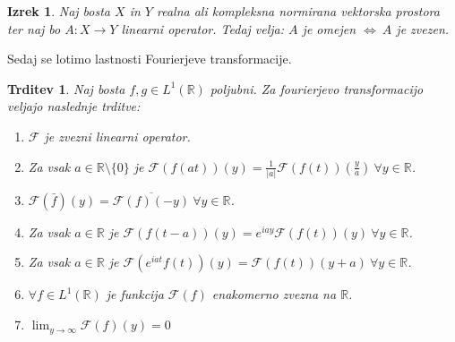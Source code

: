 \documentclass[a4paper, 10pt]{article}
\newtheorem{izr}{Izrek}
\newtheorem{trd}{Trditev}
\newcommand{\abs}[1]{\ensuremath{\lvert #1 \rvert}}
\newcommand{\mth}[1]{\ensuremath{\mathbb{#1}}}
\newcommand{\R}{\mth{R}}
\newcommand{\map}[3]{\ensuremath{{#1}: {#2} \rightarrow {#3}}}
\begin{document}
			\begin{izr}
				\label{izr:omzvlinop}
				Naj bosta $X$ in $Y$ realna ali kompleksna normirana vektorska prostora ter naj bo $\map{A}{X}{Y}$ linearni operator. Tedaj velja: $A$ je omejen $\iff~A$ je zvezen.
			\end{izr}
			Sedaj se lotimo lastnosti Fourierjeve transformacije.
			\begin{trd}
				\label{trd:propFourierT}
				Naj bosta $f, g\in L^1(\R)$ poljubni. Za fourierjevo transformacijo veljajo naslednje trditve: \begin{enumerate}
					\item $\mathcal{F}$ je zvezni linearni operator.
					\item Za vsak $a\in\R\setminus\{0\}$ je $\mathcal{F}(f(at))(y) = \frac{1}{\abs{a}}\mathcal{F}(f(t))(\frac{y}{a})~\forall y\in\R$.
					\item $\mathcal{F}(\bar{f})(y) = \overline{\mathcal{F}(f)(-y)}~\forall y\in\R$.
					\item Za vsak $a\in\R$ je $\mathcal{F}(f(t-a))(y)= e^{iay}\mathcal{F}(f(t))(y)~\forall y\in\R$.
					\item Za vsak $a\in\R$ je $\mathcal{F}(e^{iat}f(t))(y) = \mathcal{F}(f(t))(y+a)~\forall y\in\R$.
					\item $\forall f\in L^1(\R)$ je funkcija $\mathcal{F}(f)$ enakomerno zvezna na $\R$.
					\item $\lim_{y\to\infty}\mathcal{F}(f)(y) = 0$
				\end{enumerate}
			\end{trd}
\end{document}
